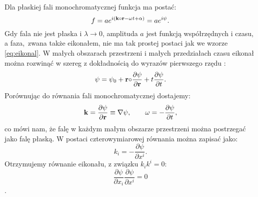 Dla płaskiej fali monochromatycznej funkcja ma postać:
%
\begin{equation}\label{eq:eikonal}f=ae^{i({\bf k}{\circ}{\bf r}-\omega t + \alpha)}=ae^{i\psi}.\end{equation}
%
Gdy fala nie jest płaska i $\lambda \rightarrow 0$, amplituda $a$ jest funkcją współrzędnych i czasu, a faza,~zwana także eikonałem, nie ma tak prostej postaci jak we wzorze \ref{eq:eikonal}. W małych obszarach przestrzeni i małych przedziałach czasu eikonał można rozwinąć w szereg z dokładnością do wyrazów pierwszego rzędu \cite{TeoriaPolaLifszyc}:
%
$$\psi=\psi_{0}+{\bf {\bf r}}{\circ}{\bf \frac{\partial \psi}{\partial {\bf r}}}+t\frac{\partial \psi}{\partial t}.$$
%
Porównując do równania fali monochromatycznej dostajemy:
%
$${\bf k}=\frac{\partial \psi}{\partial {\bf r}}\equiv {\bf \nabla}{\psi},\qquad \omega=-\frac{\partial \psi}{\partial t},$$
%
co mówi nam, że falę w każdym małym obszarze przestrzeni można postrzegać jako falę płaską. W postaci czterowymiarowej równania można zapisać jako:
%
$$k_{i}=-\frac{\partial \psi}{\partial x^{i}}.$$
%
Otrzymujemy równanie eikonału, z związku $k_{i}k^{i}=0$:
$$\frac{\partial \psi}{\partial x_{i}}\frac{\partial \psi}{\partial x^{i}}=0$$.
